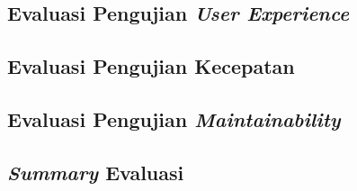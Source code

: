 	\subsection{Evaluasi Pengujian \textit{User Experience}}
	
	\subsection{Evaluasi Pengujian Kecepatan}
	
	\subsection{Evaluasi Pengujian \textit{Maintainability}}
	
	\subsection{\textit{Summary} Evaluasi}
	
	

	